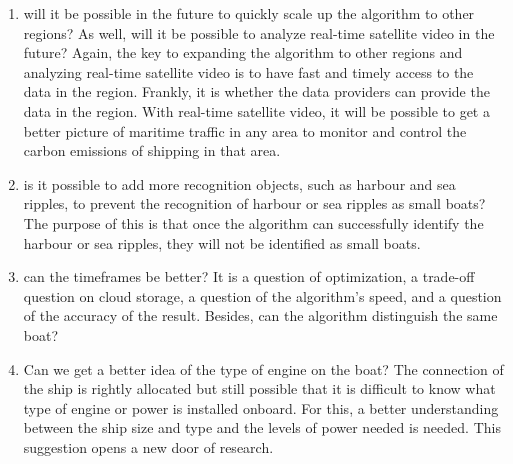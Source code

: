 \begin{enumerate}
    \item will it be possible in the future to quickly scale up the algorithm to other regions? As well, will it be possible to analyze real-time satellite video in the future? Again, the key to expanding the algorithm to other regions and analyzing real-time satellite video is to have fast and timely access to the data in the region. Frankly, it is whether the data providers can provide the data in the region. With real-time satellite video, it will be possible to get a better picture of maritime traffic in any area to monitor and control the carbon emissions of shipping in that area.
    
    \item is it possible to add more recognition objects, such as harbour and sea ripples, to prevent the recognition of harbour or sea ripples as small boats? The purpose of this is that once the algorithm can successfully identify the harbour or sea ripples, they will not be identified as small boats.
    
    \item can the timeframes be better? It is a question of optimization, a trade-off question on cloud storage, a question of the algorithm's speed, and a question of the accuracy of the result. Besides, can the algorithm distinguish the same boat?
    
    \item Can we get a better idea of the type of engine on the boat? The connection of the ship is rightly allocated but still possible that it is difficult to know what type of engine or power is installed onboard. For this, a better understanding between the ship size and type and the levels of power needed is needed. This suggestion opens a new door of research.
\end{enumerate}
 
